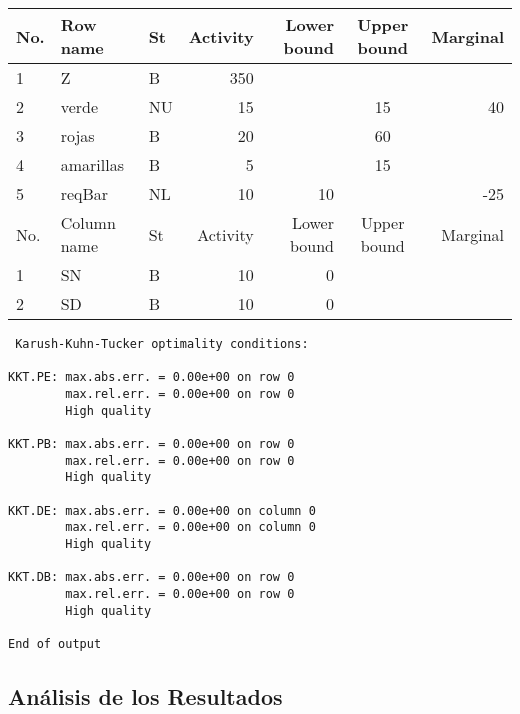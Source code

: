 \documentclass[a4paper,10pt]{article}
\begin{document}
\begin{center}
 
 \begin{tabular}{| l  l  l  r  r  c  r |}
  
    \hline
    No. &  	Row  name    &    St 	&     Activity &       Lower bound 	&     Upper bound	&      Marginal 	\\ \hline
    \hline
     1 	&	Z            &	B	&      350	&		    	&			&		\\                             
     2 	&	verde        &	NU      &	15	&                   	&       	15      & 	40	\\
     3 	&	rojas        &  B	&       20	&                   	&       	60 	&		\\
     4 	&	amarillas    &  B      &        5      &                   	& 		15 	&		\\
     5 	&	reqBar       &  NL     &       10      &      10           	&              	 	&	-25	\\ \hline
      \hline
    No.	& 	Column  name &    St 	&     Activity 	&       Lower bound 	&     Upper bound 	&      Marginal 	\\ \hline
    \hline
     1 &	SN           &	B	& 	10	&             0         &			&		\\      
     2 &	SD           &	B       &      10      &	      0          &			&		\\     
     \hline
 \end{tabular}
\end{center}

\begin{verbatim}
 Karush-Kuhn-Tucker optimality conditions:

KKT.PE: max.abs.err. = 0.00e+00 on row 0
        max.rel.err. = 0.00e+00 on row 0
        High quality

KKT.PB: max.abs.err. = 0.00e+00 on row 0
        max.rel.err. = 0.00e+00 on row 0
        High quality

KKT.DE: max.abs.err. = 0.00e+00 on column 0
        max.rel.err. = 0.00e+00 on column 0
        High quality

KKT.DB: max.abs.err. = 0.00e+00 on row 0
        max.rel.err. = 0.00e+00 on row 0
        High quality

End of output

\end{verbatim}

\subsection{An\'alisis de los Resultados}
\end{document}
